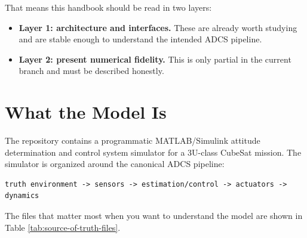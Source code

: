 \documentclass[11pt]{article}
\begin{document}
That means this handbook should be read in two layers:

\begin{itemize}
\item \textbf{Layer 1: architecture and interfaces.} These are already worth studying and are stable enough to understand the intended ADCS pipeline.
\item \textbf{Layer 2: present numerical fidelity.} This is only partial in the current branch and must be described honestly.
\end{itemize}

\tableofcontents
\clearpage

\section{What the Model Is}

The repository contains a programmatic MATLAB/Simulink attitude determination and control system simulator for a 3U-class CubeSat mission. The simulator is organized around the canonical ADCS pipeline:

\begin{verbatim}
truth environment -> sensors -> estimation/control -> actuators -> dynamics
\end{verbatim}

The files that matter most when you want to understand the model are shown in Table \ref{tab:source-of-truth-files}.
\end{document}
